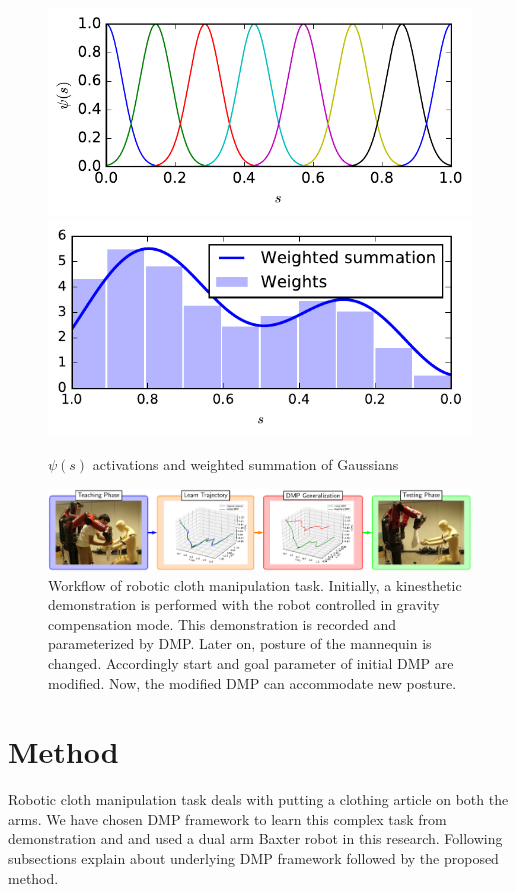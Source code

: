 \documentclass[sigconf]{acmart}
\begin{document}
\begin{figure}
	\includegraphics[width=\linewidth]{gaussian_kernels}
	\includegraphics[width=\linewidth]{weighted_summation}
	\caption{$\psi(s)$ activations and weighted summation of Gaussians}
	\label{fig:psi_activations}
\end{figure}

\begin{figure}
	\includegraphics[width=\linewidth]{flowchart_conf}
	\caption{Workflow of robotic cloth manipulation task. Initially, a kinesthetic demonstration is performed with the robot controlled in gravity compensation mode. This demonstration is recorded and parameterized by DMP. Later on, posture of the mannequin is changed. Accordingly start and goal parameter of initial DMP are modified. Now, the modified DMP can accommodate new posture.}
	\label{fig:workflow}
\end{figure}

\section{Method}
\label{sec:method}
Robotic cloth manipulation task deals with putting a clothing article on both the arms. We have chosen DMP framework to learn this complex task from demonstration and and used a dual arm Baxter robot in this research. Following subsections explain about underlying DMP framework followed by the proposed method.
\end{document}
